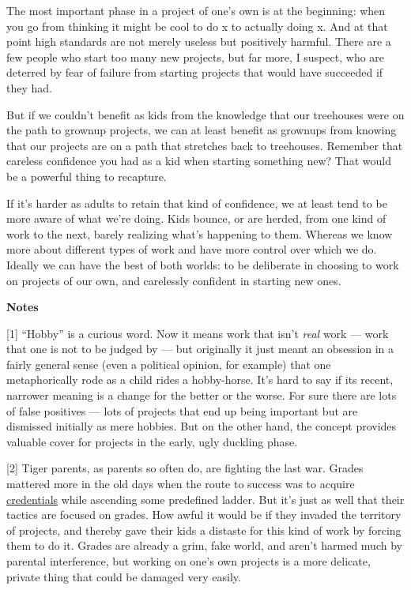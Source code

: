 The most important phase in a project of one's own is at the beginning:
when you go from thinking it might be cool to do x to actually doing x.
And at that point high standards are not merely useless but positively
harmful. There are a few people who start too many new projects, but far
more, I suspect, who are deterred by fear of failure from starting
projects that would have succeeded if they had.

But if we couldn't benefit as kids from the knowledge that our
treehouses were on the path to grownup projects, we can at least benefit
as grownups from knowing that our projects are on a path that stretches
back to treehouses. Remember that careless confidence you had as a kid
when starting something new? That would be a powerful thing to
recapture.

If it's harder as adults to retain that kind of confidence, we at least
tend to be more aware of what we're doing. Kids bounce, or are herded,
from one kind of work to the next, barely realizing what's happening to
them. Whereas we know more about different types of work and have more
control over which we do. Ideally we can have the best of both worlds:
to be deliberate in choosing to work on projects of our own, and
carelessly confident in starting new ones.

\textbf{Notes}

{[}1{]} ``Hobby'' is a curious word. Now it means work that isn't
\emph{real} work --- work that one is not to be judged by --- but
originally it just meant an obsession in a fairly general sense (even a
political opinion, for example) that one metaphorically rode as a child
rides a hobby-horse. It's hard to say if its recent, narrower meaning is
a change for the better or the worse. For sure there are lots of false
positives --- lots of projects that end up being important but are
dismissed initially as mere hobbies. But on the other hand, the concept
provides valuable cover for projects in the early, ugly duckling phase.

{[}2{]} Tiger parents, as parents so often do, are fighting the last
war. Grades mattered more in the old days when the route to success was
to acquire \href{credentials.html}{credentials} while ascending some
predefined ladder. But it's just as well that their tactics are focused
on grades. How awful it would be if they invaded the territory of
projects, and thereby gave their kids a distaste for this kind of work
by forcing them to do it. Grades are already a grim, fake world, and
aren't harmed much by parental interference, but working on one's own
projects is a more delicate, private thing that could be damaged very
easily.

